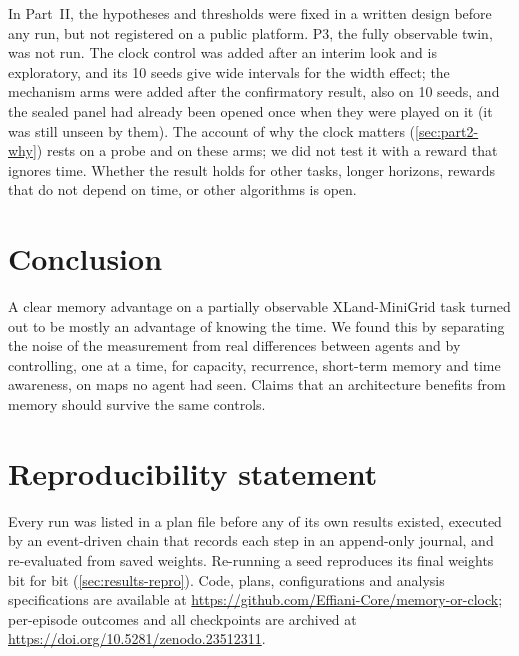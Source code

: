 \documentclass[11pt]{article}
\newcommand{\codeurl}{\url{https://github.com/Effiani-Core/memory-or-clock}}
\newcommand{\dataurl}{\url{https://doi.org/10.5281/zenodo.23512311}}
\begin{document}
In Part~II, the hypotheses and thresholds were fixed in a written design before any run, but not
registered on a public platform. P3, the fully observable twin, was not run. The clock control
was added after an interim look and is exploratory, and its 10 seeds give wide intervals for the
width effect; the mechanism arms were added after the confirmatory result, also on 10 seeds,
and the sealed panel had already been opened once when they were played on it (it was still
unseen by them). The account of why the clock matters (\cref{sec:part2-why}) rests on a probe and
on these arms; we did not test it with a reward that ignores time. Whether the result holds for other tasks, longer horizons, rewards that do not depend on
time, or other algorithms is open.

\section{Conclusion}
\label{sec:conclusion}
A clear memory advantage on a partially observable XLand-MiniGrid task turned out to be mostly
an advantage of knowing the time. We found this by separating the noise of the measurement from
real differences between agents and by controlling, one at a time, for capacity, recurrence,
short-term memory and time awareness, on maps no agent had seen. Claims that an architecture
benefits from memory should survive the same controls.

\section*{Reproducibility statement}
Every run was listed in a plan file before any of its own results existed, executed by an
event-driven
chain that records each step in an append-only journal, and re-evaluated from saved weights.
Re-running a seed reproduces its final weights bit for bit (\cref{sec:results-repro}). Code,
plans, configurations and analysis specifications are available at \codeurl; per-episode
outcomes and all checkpoints are archived at \dataurl.



\end{document}
